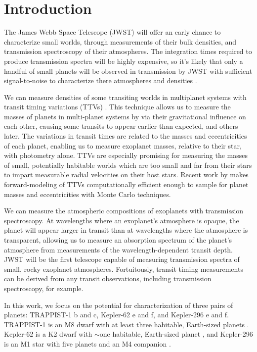\section{Introduction}

The James Webb Space Telescope (JWST) will offer an early chance to characterize small worlds, through measurements of their bulk densities, and transmission spectroscopy of their atmospheres. The integration times required to produce transmission spectra will be highly expensive, so it's likely that only a handful of small planets will be observed in transmission by JWST with sufficient signal-to-noise to characterize there atmospheres and densities \citep{Cowan2015}.

We can measure densities of some transiting worlds in multiplanet systems with transit timing variations (TTVs) \citep{Agol2005, Holman2005}. This technique allows us to measure the masses of planets in multi-planet systems by via their gravitational influence on each other, causing some transits to appear earlier than expected, and others later. The  variations in transit times are related to the masses and eccentricities of each planet, enabling us to measure exoplanet masses, relative to their star, with photometry alone. TTVs are especially promising for measuring the masses of small, potentially habitable worlds which are too small and far from their stars to impart measurable radial velocities on their host stars. Recent work by \citet{Deck2014, Agol2016a, Agol2016b} makes forward-modeling of TTVs computationally efficient enough to sample for planet masses and eccentricities with Monte Carlo techniques. 

We can measure the atmospheric compositions of exoplanets with transmission spectroscopy. At wavelengths where an exoplanet's atmosphere is opaque, the planet will appear larger in transit than at wavelengths where the atmosphere is transparent, allowing us to measure an absorption spectrum of the planet's atmosphere from measurements of the wavelength-dependent transit depth. JWST will be the first telescope capable of measuring transmission spectra of small, rocky exoplanet atmospheres. Fortuitously, transit timing measurements can be derived from any transit observations, including transmission spectroscopy, for example.

In this work, we focus on the potential for characterization of three pairs of planets: TRAPPIST-1 b and c, Kepler-62 e and f, and Kepler-296 e and f. TRAPPIST-1 is an M8 dwarf with at least three habitable, Earth-sized planets \citep{Gillon2016, Gillon2017, Delrez2018}. Kepler-62 is a K2 dwarf with $\sim$one habitable, Earth-sized planet \citep{Borucki2013}, and Kepler-296 is an M1 star with five planets and an M4 companion \citep{Barclay2015}.

